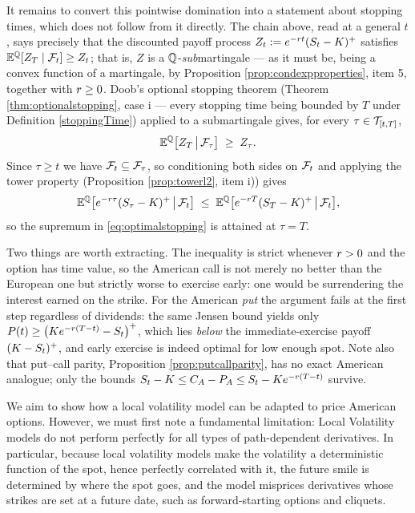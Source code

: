 It remains to convert this pointwise domination into a statement about stopping times, which does
not follow from it directly. The chain above, read at a general $t$, says precisely that the
discounted payoff process $Z_t := e^{-r t}(S_t-K)^+$ satisfies
$\mathbb{E}^{\mathbb{Q}}[Z_T \mid \mathcal{F}_t] \geq Z_t$; that is, $Z$ is a $\mathbb{Q}$-\emph{sub}martingale --- as it must be,
being a convex function of a martingale, by Proposition \ref{prop:condexpproperties}, item 5, together
with $r \geq 0$. Doob's optional stopping theorem (Theorem \ref{thm:optionalstopping}, case i --- every stopping time being bounded by $T$ under Definition \ref{stoppingTime}) applied to a
submartingale gives, for every $\tau \in \mathcal{T}_{[t,T]}$,
\[
\mathbb{E}^{\mathbb{Q}}\bigl[ Z_T \,\big|\, \mathcal{F}_\tau \bigr] \;\geq\; Z_\tau .
\]
Since $\tau \geq t$ we have $\mathcal{F}_t \subseteq \mathcal{F}_\tau$, so conditioning both sides on $\mathcal{F}_t$ and applying the tower property (Proposition \ref{prop:towerl2}, item i)) gives
\[
\mathbb{E}^{\mathbb{Q}}\bigl[e^{-r\tau}(S_\tau-K)^+ \,\big|\, \mathcal{F}_t\bigr]
\;\leq\; \mathbb{E}^{\mathbb{Q}}\bigl[e^{-r T}(S_T-K)^+ \,\big|\, \mathcal{F}_t\bigr] ,
\]
so the supremum in \eqref{eq:optimalstopping} is attained at $\tau = T$. \qedfilledtext

\medskip

Two things are worth extracting. The inequality is strict whenever $r > 0$ and the option has time
value, so the American call is not merely no better than the European one but strictly worse to
exercise early: one would be surrendering the interest earned on the strike.  For the American \emph{put} the argument fails at the first step regardless of
dividends: the same Jensen bound yields only
$P(t) \geq \bigl(K e^{-r(T-t)}-S_t\bigr)^{+}$, which lies \emph{below} the
immediate-exercise payoff $(K-S_t)^{+}$, and early exercise is indeed optimal for low
enough spot. Note also that put--call parity, Proposition \ref{prop:putcallparity}, has no exact
American analogue; only the bounds
$S_t - K \leq C_A - P_A \leq S_t - K e^{-r(T-t)}$ survive.

We aim to show how a local volatility model can be adapted to price American options. However, we must first note a fundamental limitation: Local Volatility models do not perform perfectly for all types of path-dependent derivatives. In particular, because local volatility models make the volatility a deterministic function of the spot, hence perfectly correlated with it, the future smile is determined by where the spot goes, and the model misprices derivatives whose strikes are set at a future date, such as forward-starting options and cliquets. 


